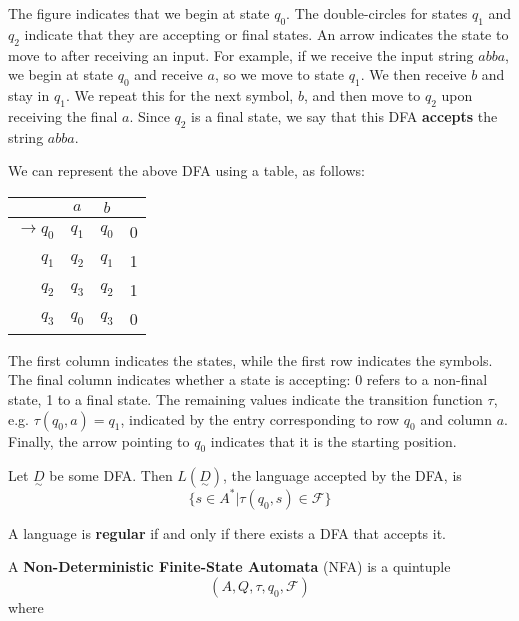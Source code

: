 The figure indicates that we begin at state \(q_0\). The double-circles for states \(q_1\) and \(q_2\) indicate that they are accepting or final states. An arrow indicates the state to move to after receiving an input. For example, if we receive the input string \(abba\), we begin at state \(q_0\) and receive \(a\), so we move to state \(q_1\). We then receive \(b\) and stay in \(q_1\). We repeat this for the next symbol, \(b\), and then move to \(q_2\) upon receiving the final \(a\). Since \(q_2\) is a final state, we say that this DFA \textbf{accepts} the string \(abba\). 

We can represent the above DFA using a table, as follows:

\begin{center}\begin{tabular}{r c c r}
         & \(a\) & \(b\) & \\\bottomrule
    \(\to q_0\) & \(q_1\) & \(q_0\) & 0 \\
    \(q_1\) & \(q_2\) & \(q_1\) & 1 \\
    \(q_2\) & \(q_3\) & \(q_2\) & 1\\
    \(q_3\) & \(q_0\) & \(q_3\) & 0\\
\end{tabular}\end{center}

The first column indicates the states, while the first row indicates the symbols. The final column indicates whether a state is accepting: 0 refers to a non-final state, 1 to a final state. The remaining values indicate the transition function \(\tau \), e.g. \(\tau(q_0, a)=q_1\), indicated by the entry corresponding to row \(q_0\) and column \(a\). Finally, the arrow pointing to \(q_0\) indicates that it is the starting position. 

\begin{definition}
Let \(\underset{\sim}{D}\) be some DFA\@. Then \(L(\underset{\sim}{D})\), the language accepted by the DFA, is \[ \{s\in A^*|\tau(q_0, s)\in \mathcal{F}\} \]
\end{definition}

\begin{definition}
A language is \textbf{regular} if and only if there exists a DFA that accepts it.
\end{definition}

\begin{definition}
A \textbf{Non-Deterministic Finite-State Automata} (NFA) is a quintuple \[(A, Q, \tau, q_0, \mathcal{F})\] where 
\end{definition}

